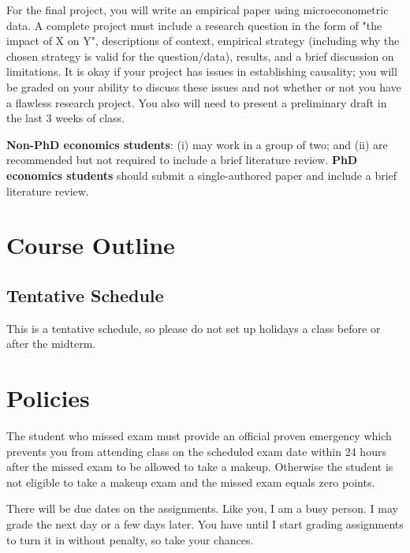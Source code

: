 \documentclass[12pt]{article}
\begin{document}
For the ﬁnal project, you will write an empirical paper using microeconometric data. 
A complete project must include a research question in the form of "the impact of X on Y", descriptions of context, empirical strategy (including why the chosen strategy is valid for the question/data), results, and a brief discussion on limitations. 
It is okay if your project has issues in establishing causality; you will be graded on your ability to discuss these issues and not whether or not you have a flawless research project.
You also will need to present a preliminary draft in the last 3 weeks of class.

\textbf{Non-PhD economics students}: (i) may work in a group of two; and (ii) are recommended but not required to include a brief literature review. 
\textbf{PhD economics students} should submit a
single-authored paper and include a brief literature review.



\section*{Course Outline}

\subsection*{Tentative Schedule}

This is a tentative schedule, so please do not set up holidays a class before or after the midterm. 

\begin{landscape}
  
\end{landscape}







\section*{Policies}

The student who missed exam must provide an official proven emergency which prevents you from attending class on the scheduled exam date within 24 hours after the missed exam to be allowed to take a makeup. Otherwise the student is not eligible to take a makeup exam and the missed exam equals zero points.

There will be due dates on the assignments. Like you, I am a busy person. I may grade the next day or a few days later. You have until I start grading assignments to turn it in without penalty, so take your chances. 
\end{document}
